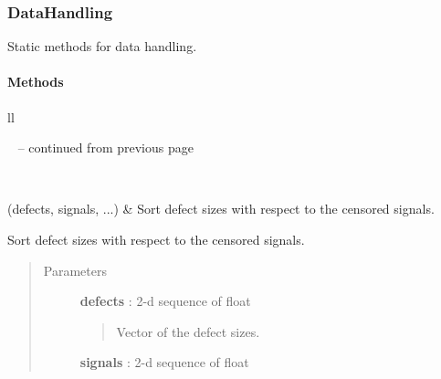 \documentclass[letterpaper,10pt,english]{sphinxmanual}
\begin{document}
\subsubsection{DataHandling}
\label{_generated/otpod.DataHandling::doc}\label{_generated/otpod.DataHandling:datahandling}

\begin{fulllineitems}
\label{_generated/otpod.DataHandling:otpod.DataHandling}
Static methods for data handling.
\paragraph{Methods}

\begin{longtable}{ll}
\hline
\endfirsthead

%
{{\textsf{\tablename\ \thetable{} -- continued from previous page}}} \\
\hline
\endhead

\hline {} \\ \hline
\endfoot

\endlastfoot


{\hyperref[_generated/otpod.DataHandling:otpod.DataHandling.filterCensoredData]{\emph{}}}(defects, signals, ...)
 & 
Sort defect sizes with respect to the censored signals.
\\
\hline\end{longtable}


\begin{fulllineitems}
\label{_generated/otpod.DataHandling:otpod.DataHandling.filterCensoredData}
Sort defect sizes with respect to the censored signals.
\begin{quote}\begin{description}
\item[{Parameters}] \leavevmode
\textbf{defects} : 2-d sequence of float
\begin{quote}

Vector of the defect sizes.
\end{quote}

\textbf{signals} : 2-d sequence of float
\begin{quote}


\end{quote}
\end{description}
\end{quote}
\end{fulllineitems}
\end{fulllineitems}
\end{document}
